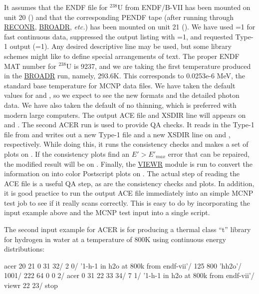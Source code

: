 \noindent
It assumes that the ENDF file for $^{238}$U from ENDF/B-VII has
been mounted on unit 20 () and that the corresponding
PENDF tape (after running through \hyperlink{sRECONRhy}{RECONR},
\hyperlink{sBROADRhy}{BROADR}, {\it etc.}) has
been mounted on unit 21 ().  We have used =1
for fast continuous data, suppressed the output listing with
=1, and requested Type-1 output (=1).
Any desired descriptive line may be used, but some library schemes
might like to define special arrangements of text.  The proper ENDF
MAT number for $^{238}$U is 9237, and we are taking the first temperature
produced in the \hyperlink{sBROADRhy}{BROADR} run,
namely, 293.6K.  This corresponds to
0.0253e-6 MeV, the standard base temperature for MCNP data files.
We have taken the default values for  and ,
so we expect to see the new formats and the detailed photon data.
We have also taken the default of no thinning, which is preferred with
modern large computers.  The output ACE file and XSDIR line will
appears on  and .  The second ACER run
is used to provide QA checks.  It reads in the Type-1 file from
 and writes out a new Type-1 file and a new XSDIR
line on  and , respectively.  While
doing this, it runs the consistency checks and makes a set of plots
on .  If the consistency plots find an $E'>E'_{max}$
error that can be repaired, the modified result will be on
.  Finally, the \hyperlink{sVIEWRhy}{VIEWR}
module is run to convert the
information on  into color Postscript plots on
.  The actual step of reading the ACE file is a
useful QA step, as are the consistency checks and plots.  In addition,
it is good practice to run the output ACE file immediately into
an simple MCNP test job to see if it really scans correctly.  This
is easy to do by incorporating the input example above and the
MCNP test input into a single script.

The second input example for ACER is for producing a thermal
class ``t'' library for hydrogen in water at a temperature of
800K using continuous energy distributions:

\small
\begin{ccode}

       acer
       20 21 0 31 32/
       2 0/
       '1-h-1 in h2o at 800k from endf-vii'/
       125 800 'hh2o'/
       1001/
       222 64 0 0 2/
       acer
       0 31 22 33 34/
       7 1/
       '1-h-1 in h2o at 800k from endf-vii'/
       viewr
       22 23/
       stop

\end{ccode}
\normalsize

